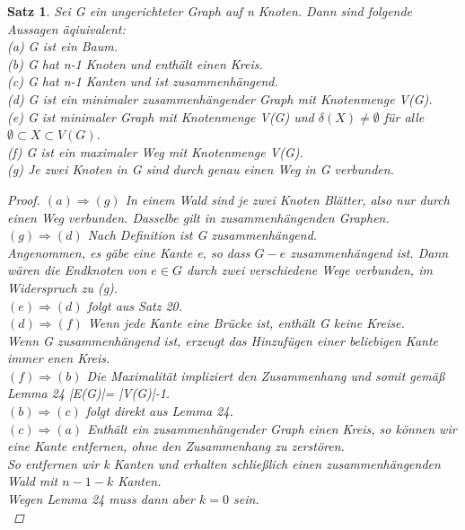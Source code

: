 \documentclass{article}
\newtheorem{satz}{Satz}
\begin{document}
  \begin{satz} 
    Sei G ein ungerichteter Graph auf n Knoten.
    Dann sind folgende Aussagen äqiuivalent:\\
      (a) G ist ein Baum.\\
      (b) G hat n-1 Knoten und enthält einen Kreis.\\
      (c) G hat n-1 Kanten und ist zusammenhängend.\\
      (d) G ist ein minimaler zusammenhängender Graph mit Knotenmenge V(G).\\
      (e) G ist minimaler Graph mit Knotenmenge V(G) und $\delta (X) \neq \emptyset$ für alle $\emptyset \subset X\subset V(G)$.\\
      (f) G ist ein maximaler Weg mit Knotenmenge V(G).\\
      (g) Je zwei Knoten in G sind durch genau einen Weg in G verbunden.\\
    \begin{proof}
      $(a)\Rightarrow (g)$ In einem Wald sind je zwei Knoten Blätter, also nur durch einen Weg verbunden. Dasselbe gilt in zusammenhängenden Graphen.
      $(g)\Rightarrow (d)$ Nach Definition ist G zusammenhängend.\\
        Angenommen, es gäbe eine Kante e, so dass $G-e$ zusammenhängend ist. Dann wären die Endknoten von $e \in G$ durch zwei verschiedene Wege verbunden, im Widerspruch zu (g).\\
      $(e)\Rightarrow (d)$ folgt aus Satz 20.\\
      $(d)\Rightarrow (f)$ Wenn jede Kante eine Brücke ist, enthält G keine Kreise.\\
        Wenn G zusammenhängend ist, erzeugt das Hinzufügen einer beliebigen Kante immer enen Kreis.\\
      $(f)\Rightarrow (b)$ Die Maximalität impliziert den Zusammenhang und somit gemäß Lemma 24 |E(G)|= |V(G)|-1.\\
      $(b)\Rightarrow (c)$ folgt direkt aus Lemma 24.\\
      $(c)\Rightarrow (a)$ Enthält ein zusammenhängender Graph einen Kreis, so können wir eine Kante entfernen, ohne den Zusammenhang zu zerstören.\\
        So entfernen wir k Kanten und erhalten schließlich einen zusammenhängenden Wald mit $n-1-k$ Kanten.\\
        Wegen Lemma 24 muss dann aber $k=0$ sein.\\
    \end{proof}
 \end{satz}
 \vspace{\baselineskip}
\end{document}
